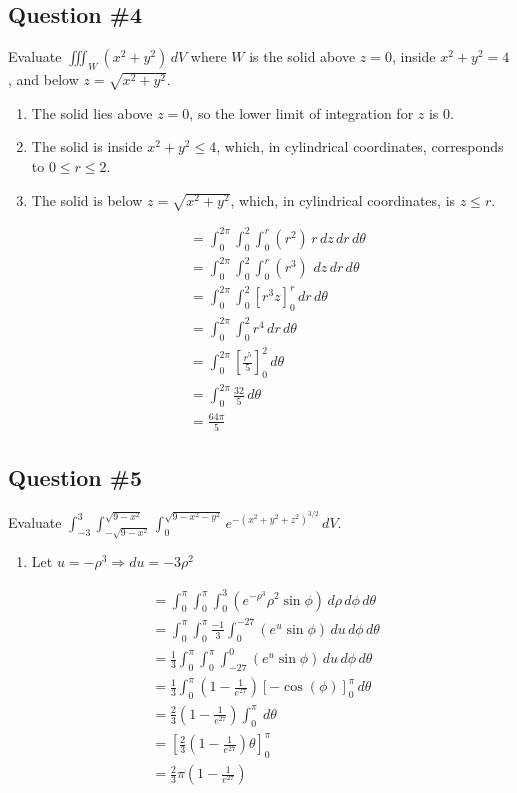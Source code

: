 \documentclass[letter,11pt]{article}
\begin{document}
\subsection{Question \#4}
Evaluate $\displaystyle \iiint_{W} \left(x^2+y^2\right) \, dV$ where $W$ is the solid above $z=0$, inside $x^2+y^2=4$, and below $z=\sqrt{x^2+y^2}$.
\begin{enumerate}
    \item The solid lies above \(z = 0\), so the lower limit of integration for \(z\) is 0.
    \item The solid is inside \(x^2 + y^2 \leq 4\), which, in cylindrical coordinates, corresponds to \(0 \leq r \leq 2\).
    \item The solid is below \(z = \sqrt{x^2 + y^2}\), which, in cylindrical coordinates, is \(z \leq r\).
    
\begin{align*}
		&= \int_0^{2\pi} \int_0^2 \int_0^r (r^2) \, r \, dz \, dr \, d\theta\\
		&= \int_0^{2\pi} \int_0^2 \int_0^r (r^3) \, \, dz \, dr \, d\theta\\
		&= \int_{0}^{2\pi}\int_{0}^{2} \left[r^3 z\right]_{0}^r \, dr \, d\theta\\
		&= \int_{0}^{2\pi}\int_{0}^{2} r^4 \, dr \, d\theta\\
		&= \int_{0}^{2\pi} \left[\frac{r^5}{5}\right]_{0}^{2} \, d\theta\\
		&= \int_{0}^{2\pi} \frac{32}{5} \, d\theta\\
		&= \boxed{\frac{64 \pi}{5} }
        \end{align*}


\end{enumerate}

\subsection{Question \#5}
Evaluate $\displaystyle \int_{-3}^{3} \int_{-\sqrt{9-x^2}}^{\sqrt{9-x^2}}\int_{0}^{\sqrt{9-x^2-y^2}} e^{-\left(x^2+y^2+z^2\right)^{3/2}} \, dV$.
\begin{enumerate}
    \item Let $u = -\rho^3 \Longrightarrow du = -3\rho^2$
\end{enumerate}
\begin{align*}
    &= \int_{0}^{\pi}\int_{0}^{\pi}\int_{0}^{3}\left(e^{-\rho^{3}}\rho^{2}\sin\phi\right)\, d\rho\, d\phi\, d\theta\\
    &= \int_{0}^{\pi}\int_{0}^{\pi}\frac{-1}{3}\int_{0}^{-27}\left(e^{u}\sin\phi\right) \, du\, d\phi\, d\theta\\
    &= \frac{1}{3}\int_{0}^{\pi}\int_{0}^{\pi}\int_{-27}^{0}\left(e^{u}\sin\phi\right)\, du\, d\phi\, d\theta\\
    &= \frac{1}{3}\int_{0}^{\pi}\left(1-\frac{1}{e^{27}}\right) \left[-\cos(\phi)\right]_{0}^{\pi} \, d\theta\\
    &= \frac{2}{3}\left(1-\frac{1}{e^{27}}\right)\int_{0}^{\pi} \ d\theta \\
    &= \left[\frac{2}{3}\left(1-\frac{1}{e^{27}}\right) \theta \right]_{0}^{\pi}\\ &= \boxed{\frac{2}{3}\pi\left(1-\frac{1}{e^{27}}\right)}
\end{align*}
\end{document}
